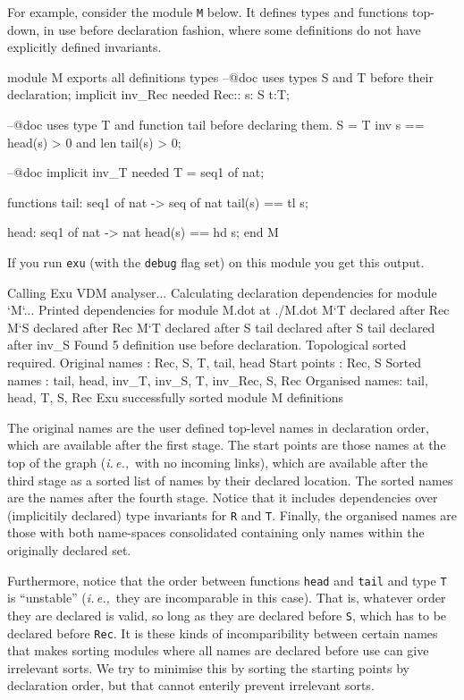 \documentclass[runningheads,a4paper]{llncs}
\newcommand{\ie}{{\em i.\,e.,\/}}
\begin{document}
For example, consider the module \verb'M' below. It defines types and functions top-down, in use before declaration fashion, where some definitions do not have explicitly defined invariants. 
%
\begin{vdmsl}[frame=none,basicstyle=\ttfamily\scriptsize,numbers=left,stepnumber=1]
    module M 
    exports all
    definitions 
    types 
        --@doc uses types S and T before their declaration; implicit inv_Rec needed
        Rec:: s: S t:T;
        
        --@doc uses type T and function tail before declaring them.
        S = T inv s == head(s) > 0 and len tail(s) > 0;
        
        --@doc implicit inv_T needed
        T = seq1 of nat;

    functions
        tail: seq1 of nat -> seq of nat
        tail(s) == tl s;

        head: seq1 of nat -> nat
        head(s) == hd s;
    end M
\end{vdmsl}
%
If you run \verb'exu' (with the \verb'debug' flag set) on this module you get this output. 
%
\begin{vdmsl}[frame=none,basicstyle=\ttfamily\scriptsize]
    Calling Exu VDM analyser...
    Calculating declaration dependencies for module `M`...
    Printed dependencies for module M.dot at ./M.dot
    M`T declared after Rec
    M`S declared after Rec
    M`T declared after S
    tail declared after S
    tail declared after inv_S
    Found 5 definition use before declaration. Topological sorted required.
    Original names : Rec, S, T, tail, head
    Start points   : Rec, S
    Sorted names   : tail, head, inv_T, inv_S, T, inv_Rec, S, Rec
    Organised names: tail, head, T, S, Rec
    Exu successfully sorted module M definitions
\end{vdmsl}
%
The original names are the user defined top-level names in declaration order, which are available after the first stage. The start points are those names at the top of the graph (\ie~with no incoming links), which are available after the third stage as a sorted list of names by their declared location. The sorted names are the names after the fourth stage. Notice that it includes dependencies over (implicitily declared) type invariants for \verb'R' and \verb'T'. Finally, the organised names are those with both name-spaces consolidated containing only names within the originally declared set. 

Furthermore, notice that the order between functions \verb'head' and \verb'tail' and type \verb'T' is ``unstable'' (\ie~they are incomparable in this case). That is, whatever order they are declared is valid, so long as they are declared before \verb'S', which has to be declared before \verb'Rec'. It is these kinds of incomparibility between certain names that makes sorting modules where all names are declared before use can give irrelevant sorts. We try to minimise this by sorting the starting points by declaration order, but that cannot enterily prevent irrelevant sorts.  
\end{document}
